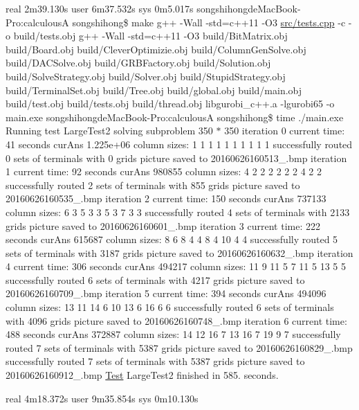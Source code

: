 real 2m39.\+130s user 6m37.\+532s sys 0m5.\+017s songshihongde\+Mac\+Book-\/\+Pro\+:calculousA songshihong\$ make g++ -\/\+Wall -\/std=c++11 -\/\+O3 \hyperlink{tests_8cpp}{src/tests.\+cpp} -\/c -\/o build/tests.\+obj g++ -\/\+Wall -\/std=c++11 -\/\+O3 build/\+Bit\+Matrix.\+obj build/\+Board.\+obj build/\+Clever\+Optimizie.\+obj build/\+Column\+Gen\+Solve.\+obj build/\+D\+A\+C\+Solve.\+obj build/\+G\+R\+B\+Factory.\+obj build/\+Solution.\+obj build/\+Solve\+Strategy.\+obj build/\+Solver.\+obj build/\+Stupid\+Strategy.\+obj build/\+Terminal\+Set.\+obj build/\+Tree.\+obj build/global.\+obj build/main.\+obj build/test.\+obj build/tests.\+obj build/thread.\+obj libgurobi\+\_\+c++.a -\/lgurobi65 -\/o main.\+exe songshihongde\+Mac\+Book-\/\+Pro\+:calculousA songshihong\$ time ./main.exe Running test Large\+Test2 solving subproblem 350 $\ast$ 350 iteration 0 current time\+: 41 seconds cur\+Ans 1.\+225e+06 column sizes\+: 1 1 1 1 1 1 1 1 1 1 successfully routed 0 sets of terminals with 0 grids picture saved to 20160626160513\+\_.\+bmp iteration 1 current time\+: 92 seconds cur\+Ans 980855 column sizes\+: 4 2 2 2 2 2 2 4 2 2 successfully routed 2 sets of terminals with 855 grids picture saved to 20160626160535\+\_.\+bmp iteration 2 current time\+: 150 seconds cur\+Ans 737133 column sizes\+: 6 3 5 3 3 5 3 7 3 3 successfully routed 4 sets of terminals with 2133 grids picture saved to 20160626160601\+\_.\+bmp iteration 3 current time\+: 222 seconds cur\+Ans 615687 column sizes\+: 8 6 8 4 4 8 4 10 4 4 successfully routed 5 sets of terminals with 3187 grids picture saved to 20160626160632\+\_.\+bmp iteration 4 current time\+: 306 seconds cur\+Ans 494217 column sizes\+: 11 9 11 5 7 11 5 13 5 5 successfully routed 6 sets of terminals with 4217 grids picture saved to 20160626160709\+\_.\+bmp iteration 5 current time\+: 394 seconds cur\+Ans 494096 column sizes\+: 13 11 14 6 10 13 6 16 6 6 successfully routed 6 sets of terminals with 4096 grids picture saved to 20160626160748\+\_.\+bmp iteration 6 current time\+: 488 seconds cur\+Ans 372887 column sizes\+: 14 12 16 7 13 16 7 19 9 7 successfully routed 7 sets of terminals with 5387 grids picture saved to 20160626160829\+\_.\+bmp successfully routed 7 sets of terminals with 5387 grids picture saved to 20160626160912\+\_.\+bmp \hyperlink{classTest}{Test} Large\+Test2 finished in 585. seconds.

real 4m18.\+372s user 9m35.\+854s sys 0m10.\+130s 